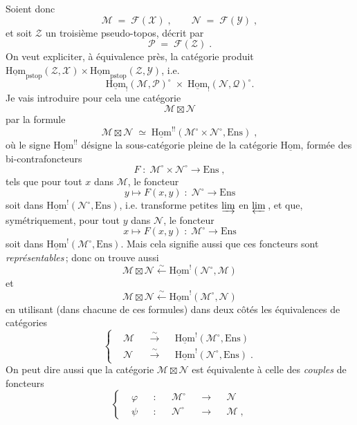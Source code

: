 \documentclass[11pt]{article}
\newcommand{\printedpage}[1]{\marginpar{\footnotesize p.~#1}}
\newcommand{\msp}[1]{\marginpar{\footnotesize [#1]}}
\newcommand{\uHom}{\underline{\mathrm{Hom}}}
\newcommand{\Ens}{\mathrm{Ens}}
\newcommand{\pstop}{\mathrm{pstop}}
\begin{document}
Soient donc
\[
\mathcal{M} \;=\; \mathcal{F}(\mathcal{X})\;, \qquad \mathcal{N} \;=\; \mathcal{F}(\mathcal{Y})\;,
\tag*{(4.1.6)}
\]
et soit $\mathcal{Z}$ un troisième pseudo-topos, décrit par
\[
\mathcal{P} \;=\; \mathcal{F}(\mathcal{Z})\;.
\tag*{(4.1.7)}
\]
On veut expliciter, à équivalence près, la catégorie produit $\uHom_{\pstop}(\mathcal{Z},\mathcal{X})\times\uHom_{\pstop}(\mathcal{Z},\mathcal{Y})$, i.e.
\[
\uHom_!(\mathcal{M},\mathcal{P})^\circ \;\times\; \uHom_!(\mathcal{N},\mathcal{Q})^\circ.
\tag*{(4.1.8)}
\] %
Je vais introduire pour cela une catégorie
\printedpage{3}
\msp{page 55}
\[
\mathcal{M}\boxtimes\mathcal{N}
\tag*{(4.1.9)}
\]
par la formule
\[
\mathcal{M}\boxtimes\mathcal{N} \;\simeq\; \uHom^{!!}(\mathcal{M}^\circ\times\mathcal{N}^\circ,\Ens)\;,
\tag*{(4.1.10)}
\]
où le signe $\uHom^{!!}$ désigne la sous-catégorie pleine de la catégorie $\uHom$, formée des bi-contrafoncteurs %
\[
F \;:\; \mathcal{M}^\circ\times\mathcal{N}^\circ \longrightarrow \Ens\;,
\tag*{(4.1.10.1)}
\]
tels que pour tout $x$ dans $\mathcal{M}$, le foncteur
\[
y \longmapsto F(x,y) \;:\; \mathcal{N}^\circ \longrightarrow \Ens
\tag*{(4.1.10.2)}
\]
soit dans $\uHom^!(\mathcal{N}^\circ,\Ens)$, i.e. transforme petites $\varinjlim$ en $\varprojlim$\,, et que, symétriquement, pour tout $y$ dans $\mathcal{N}$, le foncteur
\[
x \longmapsto F(x,y) \;:\; \mathcal{M}^\circ \longrightarrow \Ens
\tag*{(4.1.10.3)}
\]
soit dans $\uHom^!(\mathcal{M}^\circ,\Ens)$. Mais cela signifie aussi que ces foncteurs sont \textit{représentables}\,; donc on trouve aussi
\[
\mathcal{M}\boxtimes\mathcal{N} \xleftarrow{\sim} \uHom^!(\mathcal{N}^\circ,\mathcal{M})
\tag*{(4.1.11)}
\]
et
\[
\mathcal{M}\boxtimes\mathcal{N} \xleftarrow{\sim} \uHom^!(\mathcal{M}^\circ,\mathcal{N})
\tag*{(4.1.12)}
\]
\msp{page 56}
en utilisant (dans chacune de ces formules) dans deux côtés les équivalences de catégories
\[
\left\{
\begin{aligned}
&\mathcal{M} &&\xrightarrow{\sim} &&\uHom^!(\mathcal{M}^\circ,\Ens)\\
&\mathcal{N} &&\xrightarrow{\sim} &&\uHom^!(\mathcal{N}^\circ,\Ens)\;.
\end{aligned}
\right.
\tag*{(4.1.13)}
\]
On peut dire aussi que la catégorie $\mathcal{M}\boxtimes\mathcal{N}$ est équivalente à celle des \textit{couples} de foncteurs
\[
\left\{
\begin{aligned}
&\varphi &&: &&\mathcal{M}^\circ &&\longrightarrow &&\mathcal{N}\\
&\psi &&: &&\mathcal{N}^\circ &&\longrightarrow &&\mathcal{M}\;,
\end{aligned}
\right.
\tag*{(4.1.14)}
\]
\end{document}
